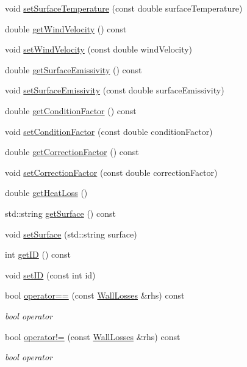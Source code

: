 \begin{DoxyCompactItemize}
void \hyperlink{class_wall_losses_a7aaa1bd0d7e0ec67db33668ccc6c48da}{set\+Surface\+Temperature} (const double surface\+Temperature)
\item 
double \hyperlink{class_wall_losses_ae68657cacdfbaf8cdc48324dd580cf3b}{get\+Wind\+Velocity} () const
\item 
void \hyperlink{class_wall_losses_ae376b7ce4e5b3c45a663395802c176a9}{set\+Wind\+Velocity} (const double wind\+Velocity)
\item 
double \hyperlink{class_wall_losses_ae1fce9523d14831ef6bc9b7823d5ea08}{get\+Surface\+Emissivity} () const
\item 
void \hyperlink{class_wall_losses_ad0ebd1a0a1b32a2358da15b6c8e63d3a}{set\+Surface\+Emissivity} (const double surface\+Emissivity)
\item 
double \hyperlink{class_wall_losses_a16ab4003a17f9e95f28b9390b92c2b27}{get\+Condition\+Factor} () const
\item 
void \hyperlink{class_wall_losses_a1533a7513460d22f433fb670700573a2}{set\+Condition\+Factor} (const double condition\+Factor)
\item 
double \hyperlink{class_wall_losses_a4ce6a0ec36cd868b14b041f18251cb6d}{get\+Correction\+Factor} () const
\item 
void \hyperlink{class_wall_losses_affdf3f6c3d54d73c7f91e1515fb12533}{set\+Correction\+Factor} (const double correction\+Factor)
\item 
double \hyperlink{class_wall_losses_a884da3507498878f619cbe5ba340c0ef}{get\+Heat\+Loss} ()
\item 
std\+::string \hyperlink{class_wall_losses_a10f5de20dc6fead726adbf62a9c49b09}{get\+Surface} () const
\item 
void \hyperlink{class_wall_losses_af329a27b78e1f2d84af6a48ffc59bfad}{set\+Surface} (std\+::string surface)
\item 
int \hyperlink{class_wall_losses_ae764fa8917879d8c24df7582c159fec6}{get\+ID} () const
\item 
void \hyperlink{class_wall_losses_a3a135d9bfd6c6f1c4742031ab568b26d}{set\+ID} (const int id)
\item 
\mbox{\label{class_wall_losses_ad9eebb34927690332c00df51507878e9}} 
bool \hyperlink{class_wall_losses_ad9eebb34927690332c00df51507878e9}{operator==} (const \hyperlink{class_wall_losses}{Wall\+Losses} \&rhs) const
\begin{DoxyCompactList}\small\item\em bool operator \end{DoxyCompactList}\item 
\mbox{\label{class_wall_losses_a46d50205e67870978292c4bfa1c9d329}} 
bool \hyperlink{class_wall_losses_a46d50205e67870978292c4bfa1c9d329}{operator!=} (const \hyperlink{class_wall_losses}{Wall\+Losses} \&rhs) const
\begin{DoxyCompactList}\small\item\em bool operator \end{DoxyCompactList}\end{DoxyCompactItemize}
